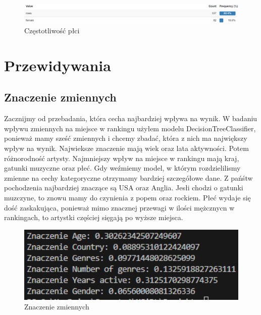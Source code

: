 \documentclass[12pt, letterpaper]{article}
\begin{document}
\begin{figure}[h]
    \centering
    \includegraphics[width=1\textwidth]{gender_frequency}  
    \caption{Częstotliwość płci}
\end{figure}

\section{Przewidywania}

\subsection{Znaczenie zmiennych}

Zacznijmy od przebadania, która cecha najbardziej wpływa na wynik. W badaniu wpływu zmiennych na miejsce w rankingu użyłem modelu DecisionTreeClassifier, ponieważ mamy sześć zmiennych i chcemy zbadać, która z nich ma największy wpływ na wynik. Najwieksze znaczenie mają wiek oraz lata aktywności. Potem różnorodność artysty. Najmniejszy wpływ na miejsce w rankingu mają kraj, gatunki muzyczne oraz płeć. Gdy weźmiemy model, w którym rozdzielilismy zmienne na cechy kategoryczne otrzymamy bardziej szczegółowe dane. Z pańśtw pochodzenia najbardziej znaczące są USA oraz Anglia. Jesłi chodzi o gatunki muzczyne, to znowu mamy do czynienia z popem oraz rockiem. Płeć wydaje się dość zaskakująca, ponieważ mimo znacznej przewagi w ilości mężcznycn w rankingach, to artystki częściej sięgają po wyższe miejsca.

\begin{figure}[h]
    \centering
    \includegraphics[width=1\textwidth]{importances}  
    \caption{Znaczenie zmiennych}
\end{figure}
\end{document}
